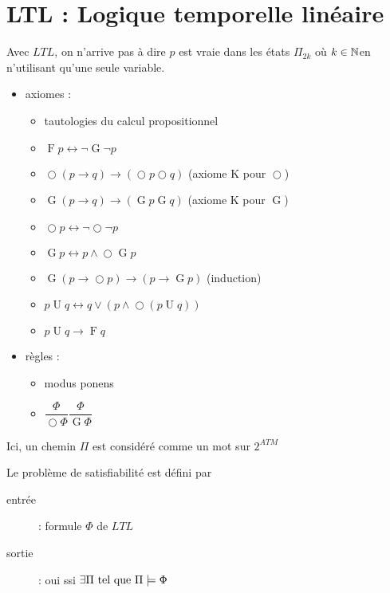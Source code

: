 \documentclass[10pt,a4paper]{article}
\DeclareMathOperator{\Oo}{\bigcirc}
\DeclareMathOperator{\Fo}{F}
\DeclareMathOperator{\Go}{G}
\DeclareMathOperator{\Uo}{U}
\begin{document}
\section{LTL : Logique temporelle linéaire}

\begin{prop}
 Avec $LTL$, on n'arrive pas à dire \og $p$ est vraie dans les états $\Pi_{2k}$ où $k \in \mathbb{N}$\fg en n'utilisant qu'une seule variable.
\end{prop}

\begin{definition}
 \begin{itemize}
  \item axiomes :
\begin{itemize}
 \item tautologies du calcul propositionnel
 \item $\Fo p \leftrightarrow \lnot \Go \lnot p$
 \item $ \Oo ( p \rightarrow q) \rightarrow (  \Oo p  \Oo q)$ (axiome K pour $ \Oo$)
 \item $\Go ( p \rightarrow q) \rightarrow ( \Go p \Go q) $ (axiome K pour $\Go$)
 \item $ \Oo p \leftrightarrow \lnot  \Oo \lnot p$
 \item $\Go p \leftrightarrow p \wedge  \Oo \Go p$
 \item $\Go ( p \rightarrow  \Oo p) \rightarrow (p \rightarrow \Go p)$ (induction)
 \item $p \Uo q \leftrightarrow q \vee (p \wedge  \Oo (p \Uo q))$
 \item $p \Uo q \rightarrow \Fo q$
\end{itemize}
\item règles :
\begin{itemize}
 \item modus ponens
 \item $\dfrac{\Phi}{ \Oo \Phi} \dfrac{\Phi}{\Go \Phi}$
\end{itemize}
 \end{itemize}
\end{definition}

\begin{definition}
Ici, un chemin $\Pi$ est considéré comme un mot sur $2^{ATM}$

Le problème de satisfiabilité est défini par
\begin{description}
 \item [entrée] : formule $\Phi$ de $LTL$
 \item[sortie] : oui ssi $\exists \Pi \text{ tel que } \Pi \models \Phi$
\end{description}
\end{definition}
\end{document}
